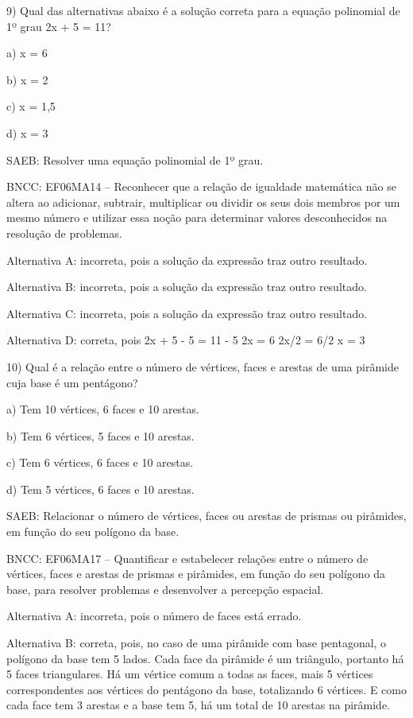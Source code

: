 9) Qual das alternativas abaixo é a solução correta para a equação
polinomial de 1º grau 2x + 5 = 11?

a) x = 6

b) x = 2

c) x = 1,5

d) x = 3

SAEB: Resolver uma equação polinomial de 1º grau.

BNCC: EF06MA14 -- Reconhecer que a relação de igualdade matemática não
se altera ao adicionar, subtrair, multiplicar ou dividir os seus dois
membros por um mesmo número e utilizar essa noção para determinar
valores desconhecidos na resolução de problemas.

Alternativa A: incorreta, pois a solução da expressão traz outro
resultado.

Alternativa B: incorreta, pois a solução da expressão traz outro
resultado.

Alternativa C: incorreta, pois a solução da expressão traz outro
resultado.

Alternativa D: correta, pois 2x + 5 - 5 = 11 - 5 2x = 6 2x/2 = 6/2 x = 3

10) Qual é a relação entre o número de vértices, faces e arestas de uma
pirâmide cuja base é um pentágono?

a) Tem 10 vértices, 6 faces e 10 arestas.

b) Tem 6 vértices, 5 faces e 10 arestas.

c) Tem 6 vértices, 6 faces e 10 arestas.

d) Tem 5 vértices, 6 faces e 10 arestas.

SAEB: Relacionar o número de vértices, faces ou arestas de prismas ou
pirâmides, em função do seu polígono da base.

BNCC: EF06MA17 -- Quantificar e estabelecer relações entre o número de
vértices, faces e arestas de prismas e pirâmides, em função do seu
polígono da base, para resolver problemas e desenvolver a percepção
espacial.

Alternativa A: incorreta, pois o número de faces está errado.

Alternativa B: correta, pois, no caso de uma pirâmide com base
pentagonal, o polígono da base tem 5 lados. Cada face da pirâmide é um
triângulo, portanto há 5 faces triangulares. Há um vértice comum a todas
as faces, mais 5 vértices correspondentes aos vértices do pentágono da
base, totalizando 6 vértices. E como cada face tem 3 arestas e a base
tem 5, há um total de 10 arestas na pirâmide.

